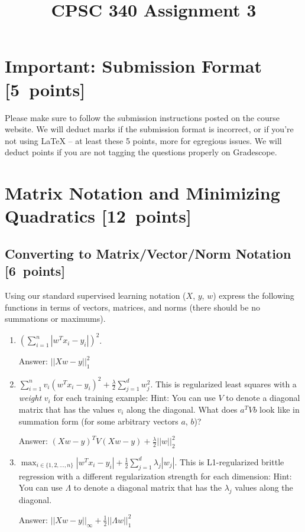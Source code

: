 \documentclass{article}
\newcommand{\blu}[1]{{\textcolor{blu}{#1}}}
\newenvironment{answer}{\par\begingroup\color{gre}Answer: }{\endgroup}
\let\ask\blu
\newcommand\pts[1]{\textcolor{pointscolour}{[#1~points]}}
\begin{document}
\title{CPSC 340 Assignment 3}
\date{}
\maketitle


\vspace{-4em}


\section*{Important: Submission Format \pts{5}}

    Please make sure to follow the submission instructions posted on the course website.
    \ask{We will deduct marks if the submission format is incorrect, or if you're not using \LaTeX{}} -- at least these 5 points, more for egregious issues.
    \ask{We will deduct points if you are not tagging the questions properly on Gradescope.}


\section{Matrix Notation and Minimizing Quadratics \pts{12}}

\subsection{Converting to Matrix/Vector/Norm Notation \pts{6}}

Using our standard supervised learning notation ($X$, $y$, $w$)
\ask{express the following functions in terms of vectors, matrices, and norms} (there should be no summations or maximums).
\begin{enumerate}
\item $\left(\sum_{i=1}^n |w^Tx_i - y_i|\right)^2$. 
\begin{answer}
${||Xw-y||}_1^2$
\end{answer}
\item $\sum_{i=1}^n v_i(w^Tx_i  - y_i)^2 + \frac{\lambda}{2}\sum_{j=1}^d w_j^2$. This is regularized least squares with a \emph{weight} $v_i$ for each training example:  Hint: You can use $V$ to denote a diagonal matrix that has the values $v_i$ along the diagonal. What does $a^T V b$ look like in summation form (for some arbitrary vectors $a$, $b$)?
\begin{answer}
${(Xw-y)}^TV(Xw-y) + \frac{\lambda}{2}{||w||_2^2}$
\end{answer}
\item $\max_{i \in \{1,2,\dots,n\}}  |w^Tx_i - y_i| +  \frac12 \sum_{j=1}^{d} \lambda_j|w_j|$. This is L1-regularized brittle regression with a different regularization strength for each dimension: Hint: You can use  $\Lambda$ to denote a diagonal matrix that has the $\lambda_j$ values along the diagonal.
\begin{answer}
${||Xw - y||}_{\infty} + \frac{1}{2}{||\Lambda w||_1^2}$
\end{answer}
\end{enumerate}
\end{document}
